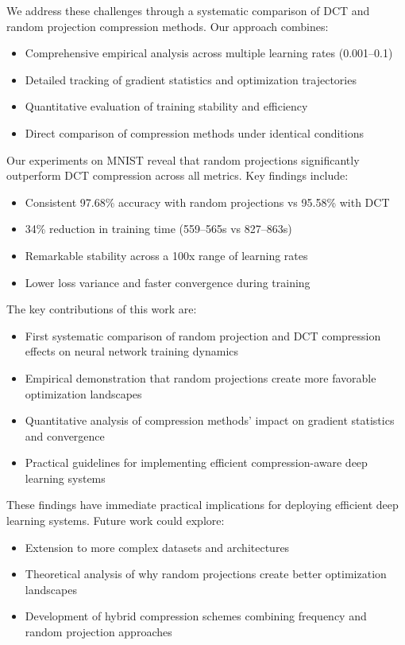 \documentclass{article} %
\begin{document}
We address these challenges through a systematic comparison of DCT and random projection compression methods. Our approach combines:
\begin{itemize}
    \item Comprehensive empirical analysis across multiple learning rates (0.001--0.1)
    \item Detailed tracking of gradient statistics and optimization trajectories
    \item Quantitative evaluation of training stability and efficiency
    \item Direct comparison of compression methods under identical conditions
\end{itemize}

Our experiments on MNIST reveal that random projections significantly outperform DCT compression across all metrics. Key findings include:
\begin{itemize}
    \item Consistent 97.68\% accuracy with random projections vs 95.58\% with DCT
    \item 34\% reduction in training time (559--565s vs 827--863s)
    \item Remarkable stability across a 100x range of learning rates
    \item Lower loss variance and faster convergence during training
\end{itemize}

The key contributions of this work are:
\begin{itemize}
    \item First systematic comparison of random projection and DCT compression effects on neural network training dynamics
    \item Empirical demonstration that random projections create more favorable optimization landscapes
    \item Quantitative analysis of compression methods' impact on gradient statistics and convergence
    \item Practical guidelines for implementing efficient compression-aware deep learning systems
\end{itemize}

These findings have immediate practical implications for deploying efficient deep learning systems. Future work could explore:
\begin{itemize}
    \item Extension to more complex datasets and architectures
    \item Theoretical analysis of why random projections create better optimization landscapes
    \item Development of hybrid compression schemes combining frequency and random projection approaches
\end{itemize}
\end{document}
